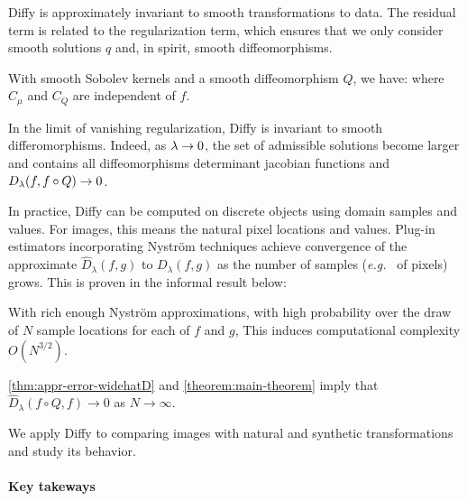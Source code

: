 Diffy is approximately invariant to smooth transformations to data. The residual term is related to the regularization term, which ensures that we only consider smooth solutions $q$ and, in spirit, smooth diffeomorphisms.
\begin{mdframed}
\begin{informaltheorem}
With smooth Sobolev kernels and a smooth diffeomorphism $Q$, we have:
where $C_\mu$ and $C_Q$ are independent of $f$.
\end{informaltheorem}
\end{mdframed}
\noindent In the limit of vanishing regularization, Diffy is invariant to smooth differomorphisms. Indeed, as $\lambda \to 0$, the set of admissible solutions become larger and contains all diffeomorphisms determinant jacobian functions and $D_\lambda(f, f\circ Q)\to 0$.

In practice, Diffy can be computed on discrete objects using domain samples and values. For images, this means the natural pixel locations and values. Plug-in estimators incorporating Nyström techniques achieve convergence of the approximate $\hat D_\lambda(f, g)$ to $D_\lambda(f, g)$ as the number of samples (\emph{e.g.\ } of pixels) grows. This is proven in the informal result below:
\begin{mdframed}
\begin{informaltheorem}
With rich enough Nyström approximations, with high probability over the draw of $N$ sample locations for each of $f$ and $g$,
This induces computational complexity $O(N^{3/2})$.
\end{informaltheorem}
\end{mdframed}
\noindent \cref{thm:appr-error-widehatD} and \cref{theorem:main-theorem} imply that $\hat D_\lambda(f\circ Q, f)\to 0$ as $N\to \infty$.

We apply Diffy to comparing images with natural and synthetic transformations and study its behavior.

\paragraph{Key takeways}

